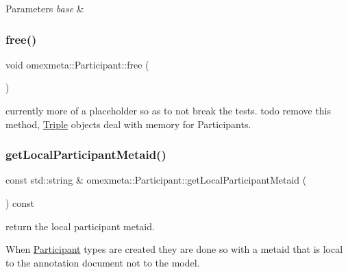 \begin{DoxyParams}{Parameters}
{\em base} & \\
\hline
\end{DoxyParams}
\mbox{\label{classomexmeta_1_1Participant_a395bc8d2561149a77371ed80e2ed1517}} 
\subsubsection{\texorpdfstring{free()}{free()}}
{\footnotesize\ttfamily void omexmeta\+::\+Participant\+::free (\begin{DoxyParamCaption}{ }\end{DoxyParamCaption})}

currently more of a placeholder so as to not break the tests. todo remove this method, \hyperlink{classomexmeta_1_1Triple}{Triple} objects deal with memory for Participants. \mbox{\label{classomexmeta_1_1Participant_a8a6626e17aca48b76465d66928eee78f}} 
\subsubsection{\texorpdfstring{get\+Local\+Participant\+Metaid()}{getLocalParticipantMetaid()}}
{\footnotesize\ttfamily const std\+::string \& omexmeta\+::\+Participant\+::get\+Local\+Participant\+Metaid (\begin{DoxyParamCaption}{ }\end{DoxyParamCaption}) const}



return the local participant metaid. 

When \hyperlink{classomexmeta_1_1Participant}{Participant} types are created they are done so with a metaid that is local to the annotation document not to the model. \mbox{\label{classomexmeta_1_1Participant_ac7121064734a05141a57f39dce10e71a}} 
